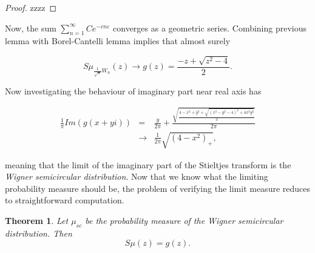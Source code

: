\documentclass[12pt,a4paper,leqno]{report}
\theoremstyle{plain}
\newtheorem{theo}[equation]{Theorem}
\theoremstyle{definition}
\theoremstyle{remark}
\begin{document}
\begin{proof}
zzzz
\end{proof}

Now, the sum $\sum_{n=1}^{\infty} Ce^{-cn\varepsilon}$ converges as a geometric series. Combining previous lemma with Borel-Cantelli lemma implies that almost surely

\begin{equation*}
S\mu_{\frac{1}{\sqrt{n}}W_n}(z) \to g(z) = \frac{-z + \sqrt{z^2-4}}{2}.
\end{equation*}

Now investigating the behaviour of imaginary part near real axis has

\begin{eqnarray*}
\frac{1}{\pi} Im(g(x+yi)) & = &
\frac{y}{2\pi} + \frac{\sqrt{\frac{4-x^2+y^2+\sqrt{(x^2-y^2-4)^2+4x^2y^2}}{2}}}{2\pi}\\
& \to & \frac{1}{2\pi} \sqrt{(4-x^2)_+},
\end{eqnarray*}

meaning that the limit of the imaginary part of the Stieltjes transform is the \emph{Wigner semicircular distribution}. Now that we know what the limiting probability measure should be, the problem of verifying the limit measure reduces to straightforward computation.

\begin{theo}
Let $\mu_{sc}$ be the probability measure of the Wigner semicircular distribution. Then
\begin{equation*}
S\mu(z) = g(z).
\end{equation*}
\end{theo}
\end{document}
